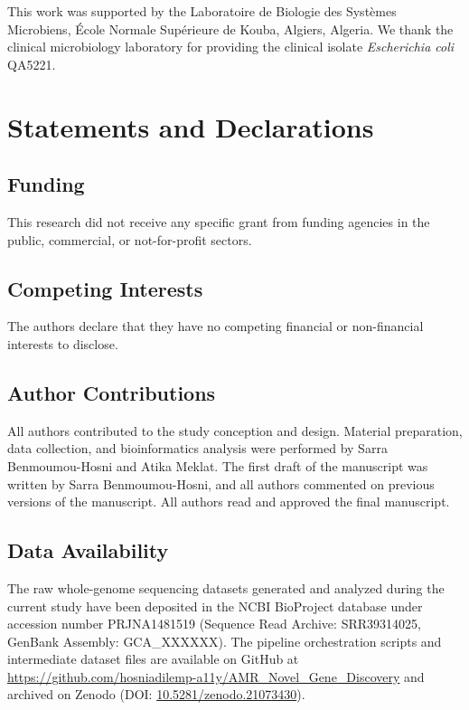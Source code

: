 \documentclass[pdflatex,sn-mathphys-num]{sn-jnl}
\begin{document}
\backmatter

This work was supported by the Laboratoire de Biologie des Systèmes Microbiens, École Normale Supérieure de Kouba, Algiers, Algeria. We thank the clinical microbiology laboratory for providing the clinical isolate \textit{Escherichia coli} QA5221.



\section*{Statements and Declarations}

\subsection*{Funding}
This research did not receive any specific grant from funding agencies in the public, commercial, or not-for-profit sectors. 

\subsection*{Competing Interests}
The authors declare that they have no competing financial or non-financial interests to disclose.

\subsection*{Author Contributions}
All authors contributed to the study conception and design. Material preparation, data collection, and bioinformatics analysis were performed by Sarra Benmoumou-Hosni and Atika Meklat. The first draft of the manuscript was written by Sarra Benmoumou-Hosni, and all authors commented on previous versions of the manuscript. All authors read and approved the final manuscript.

\subsection*{Data Availability}
The raw whole-genome sequencing datasets generated and analyzed during the current study have been deposited in the NCBI BioProject database under accession number PRJNA1481519 (Sequence Read Archive: SRR39314025, GenBank Assembly: GCA\_XXXXXX). %
The pipeline orchestration scripts and intermediate dataset files are available on GitHub at \href{https://github.com/hosniadilemp-a11y/AMR_Novel_Gene_Discovery}{https://github.com/hosniadilemp-a11y/AMR\_Novel\_Gene\_Discovery} and archived on Zenodo (DOI: \href{https://doi.org/10.5281/zenodo.21073430}{10.5281/zenodo.21073430}).
\end{document}
